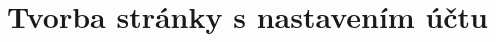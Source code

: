 \fancyhf{}
\rfoot{\helv \thepage}

\chapter{Tvorba stránky s nastavením účtu}


\newpage

\newpage

\newpage

\newpage